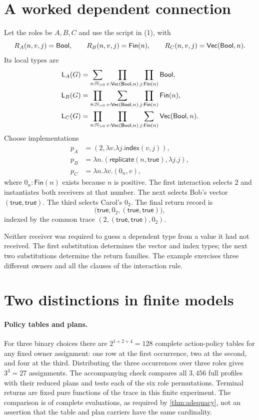 \section{A worked dependent connection}
\label{app:worked}

Let the roles be $A,B,C$ and use the script in (1), with
\[
 R_A(n,v,j)=\mathsf{Bool},\qquad R_B(n,v,j)=\mathsf{Fin}(n),
 \qquad R_C(n,v,j)=\mathsf{Vec}(\mathsf{Bool},n).
\]
Its local types are
\begin{align*}
 \mathsf L_{A}(G)
   &=\sum_{n:\mathbb N_{>0}}\prod_{v:\mathsf{Vec}(\mathsf{Bool},n)}
                    \prod_{j:\mathsf{Fin}(n)}\mathsf{Bool},\\
 \mathsf L_{B}(G)
   &=\prod_{n:\mathbb N_{>0}}\sum_{v:\mathsf{Vec}(\mathsf{Bool},n)}
                    \prod_{j:\mathsf{Fin}(n)}\mathsf{Fin}(n),\\
 \mathsf L_{C}(G)
   &=\prod_{n:\mathbb N_{>0}}\prod_{v:\mathsf{Vec}(\mathsf{Bool},n)}
                    \sum_{j:\mathsf{Fin}(n)}\mathsf{Vec}(\mathsf{Bool},n).
\end{align*}
Choose implementations
\begin{align*}
 p_A&=(2,\lambda v.\lambda j.\mathsf{index}(v,j)),\\
 p_B&=\lambda n.(\mathsf{replicate}(n,\mathsf{true}),\lambda j.j),\\
 p_C&=\lambda n.\lambda v.(0_n,v),
\end{align*}
where $0_n:\mathsf{Fin}(n)$ exists because $n$ is positive. The first
interaction selects $2$ and instantiates both receivers at that number.
The next selects Bob's vector $(\mathsf{true},\mathsf{true})$. The third
selects Carol's $0_2$. The final return record is
\[
 \bigl(\mathsf{true},0_2,
       (\mathsf{true},\mathsf{true})\bigr),
\]
indexed by the common trace
$(2,(\mathsf{true},\mathsf{true}),0_2)$.

Neither receiver was required to guess a dependent type from a value it had
not received. The first substitution determines the vector and index types;
the next two substitutions determine the return families. The example
exercises three different owners and all the clauses of the interaction rule.

\section{Two distinctions in finite models}

\paragraph{Policy tables and plans.}
For three binary choices there are $2^{1+2+4}=128$ complete action-policy
tables for any fixed owner assignment: one row at the first occurrence, two
at the second, and four at the third. Distributing the three occurrences over
three roles gives $3^3=27$ assignments. The accompanying check compares all
$3,456$ full profiles with their reduced plans and tests each of the six role
permutations. Terminal returns are fixed pure functions of the trace in this
finite experiment. The comparison is of complete evaluations, as required by
\cref{thm:adequacy}, not an assertion that the table and plan carriers have
the same cardinality.

